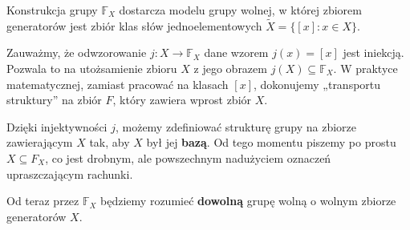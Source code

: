 \begin{center}
\end{center}

\begin{remark}
    Konstrukcja grupy $\mathbb{F}_X$ dostarcza modelu grupy wolnej, w której zbiorem generatorów jest zbiór klas słów jednoelementowych $\tilde{X} = \{ [x] : x \in X \}$. 
    
    Zauważmy, że odwzorowanie $j: X \to \mathbb{F}_X$ dane wzorem $j(x) = [x]$ jest iniekcją. Pozwala to na utożsamienie zbioru $X$ z jego obrazem $j(X) \subseteq \mathbb{F}_X$. W praktyce matematycznej, zamiast pracować na klasach $[x]$, dokonujemy „transportu struktury” na zbiór $F$, który zawiera wprost zbiór $X$.

\noindent Dzięki injektywności $j$, możemy zdefiniować strukturę grupy na zbiorze zawierającym $X$ tak, aby $X$ był jej \textbf{bazą}. Od tego momentu piszemy po prostu $X \subseteq F_X$, co jest drobnym, ale powszechnym nadużyciem oznaczeń upraszczającym rachunki.
\end{remark}

\begin{context}
    Od teraz przez $\mathbb{F}_X$ będziemy rozumieć \textbf{dowolną} grupę wolną o wolnym zbiorze generatorów $X$.
\end{context}

